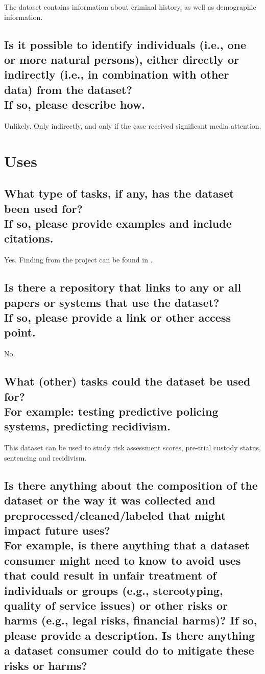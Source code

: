 \documentclass[letterpaper, 10 pt, conference]{ieeeconf}  %
\newcommand{\subtitle}[1]{{\\ \small \normalfont \color{purple} #1}}
\begin{document}
The dataset contains information about criminal history, as well as demographic information. 

\subsection{Is it possible to identify individuals (i.e., one or more natural persons), either directly or indirectly (i.e., in combination with other data) from the dataset? \subtitle{If so, please describe how.}}

Unlikely. Only indirectly, and only if the case received significant media attention.  

\section{Uses}

\subsection{What type of tasks, if any, has the dataset been used for? \subtitle{If so, please provide examples and include citations.}}

Yes. Finding from the project can be found in \cite{report}.


\subsection{Is there a repository that links to any or all papers or systems that use the dataset? \subtitle{If so, please provide a link or other access point. }}

No.

\subsection{What (other) tasks could the dataset be used for? \subtitle{For example: testing predictive policing systems, predicting recidivism.}}

This dataset can be used to study risk assessment scores, pre-trial custody status, sentencing and recidivism. 

\subsection{Is there anything about the composition of the dataset or the way it was collected and preprocessed/cleaned/labeled that might impact future uses? \subtitle{For example, is there anything that a dataset consumer might need to know to avoid uses that could result in unfair treatment of individuals or groups (e.g., stereotyping, quality of service issues) or other risks or harms (e.g., legal risks, financial harms)? If so, please provide a description. Is there anything a dataset consumer could do to mitigate these risks or harms?}}
\end{document}
